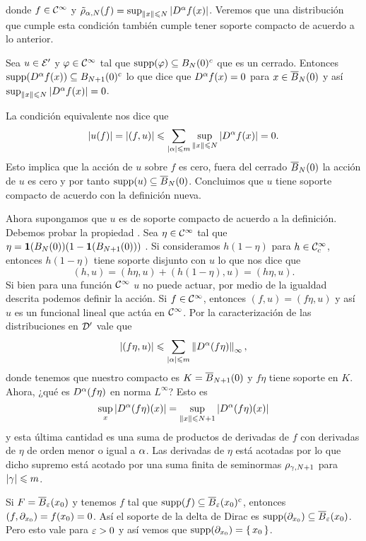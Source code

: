 \documentclass[12pt]{memoir}
\begin{document}
donde $f\in\mathcal{C}^\infty$ y $\tilde{\rho}_{\alpha,N}(f)=\sup_{\left\|x\right\|\leqslant N}|D^\alpha f(x)|$. Veremos que una distribución que cumple esta condición también cumple tener soporte compacto de acuerdo a lo anterior.

\begin{ptcbp}
  Sea $u\in\mathcal{E}'$ y $\varphi\in\mathcal{C}^\infty$ tal que $\operatorname{supp}(\varphi)\subseteq B_N(0)^c$ que es un cerrado. Entonces  $\operatorname{supp}(D^\alpha f(x))\subseteq B_{N+1}(0)^c$ lo que dice que $D^\alpha f(x)=0$ para $x\in\overline B_N(0)$ y así $\sup_{\left\|x\right\|\leqslant N}|D^\alpha f(x)|=0$.\par 
  La condición equivalente nos dice que 
  $$|u(f)|=|(f,u)|\leqslant\sum_{|\alpha|\leqslant m}\sup_{\left\|x\right\|\leqslant N}|D^\alpha f(x)|=0.$$
  Esto implica que la acción de $u$ sobre $f$ es cero, fuera del cerrado $\overline B_N(0)$ la acción de $u$ es cero y por tanto $\operatorname{supp}(u)\subseteq \overline B_N(0)$. Concluimos que $u$ tiene soporte compacto de acuerdo con la definición nueva.\par 
  Ahora supongamos que $u$ es de soporte compacto de acuerdo a la definición. Debemos probar la propiedad . Sea $\eta\in\mathcal{C}^\infty$ tal que $\eta=\mathbf{1}(B_N(0))(1-\mathbf{1}(B_{N+1}(0)))$ . Si consideramos $h(1-\eta)$ para $h\in\mathcal{C}^\infty_c$, entonces $h(1-\eta)$ tiene soporte disjunto con $u$ lo que nos dice que
  $$(h,u)=(h\eta,u)+(h(1-\eta),u)=(h\eta,u).$$
  Si bien para una función $\mathcal{C}^\infty$ $u$ no puede actuar, por medio de la igualdad descrita podemos definir la acción. Si $f\in\mathcal{C}^\infty$, entonces $(f,u)=(f\eta, u)$ y así $u$ es un funcional lineal que actúa en $\mathcal{C}^\infty$. Por la caracterización de las distribuciones en $\mathcal{D}'$ vale que 
  $$|(f\eta,u)|\leqslant\sum_{|\alpha|\leqslant m}\left\|D^\alpha(f\eta)\right\|_{\infty},$$
  donde tenemos que nuestro compacto es $K=\overline B_{N+1}(0)$ y $f\eta$ tiene soporte en $K$. Ahora, ¿qué es $D^\alpha(f\eta)$ en norma $L^\infty$? Esto es 
  $$\sup_{x}|D^\alpha(f\eta)(x)|=\sup_{\left\|x\right\|\leqslant N+1}|D^\alpha(f\eta)(x)|$$
  y esta última cantidad es una suma de productos de derivadas de $f$ con derivadas de $\eta$ de orden menor o igual a $\alpha$. Las derivadas de $\eta$ está acotadas por lo que dicho supremo está acotado por una suma finita de seminormas $\rho_{\gamma,N+1}$ para $|\gamma|\leqslant m$. 
\end{ptcbp}

\begin{Ex}
  Si $F=\overline B_\varepsilon(x_0)$ y tenemos $f$ tal que $\operatorname{supp}(f)\subseteq \overline{B}_\varepsilon(x_0)^c$, entonces $(f,\partial_{x_0})=f(x_0)=0$. Así el soporte de la delta de Dirac es $\operatorname{supp}(\partial_{x_0})\subseteq\overline B_\varepsilon(x_0)$. Pero esto vale para $\varepsilon>0$ y así vemos que $\operatorname{supp}(\partial_{x_0})=\{\,x_0\,\}$.
\end{Ex}
\end{document}
